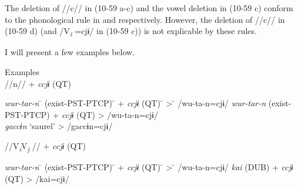 The deletion of //c// in (10-59 a-c) and the vowel deletion in (10-59 c) conform to the phonological rule in  and  respectively. However, the deletion of //c// in (10-59 d) (and /V\textit{\textsubscript{i} }=cjɨ/ in (10-59 c)) is not explicable by these rules.

I will present a few examples below.

\ea\label{ex:10.60}   Examples\\
  \ea //n// + \textit{ccjɨ} (QT)\\
  \begin{tabbing}
  \textit{wur-tar-n} \hspace{\tabcolsep}\=\hspace{\tabcolsep} (exist-PST-PTCP) \hspace{\tabcolsep}\=\hspace{\tabcolsep} +  \textit{ccjɨ}  (QT) \hspace{\tabcolsep}\=\hspace{\tabcolsep} > \hspace{\tabcolsep}\=\hspace{\tabcolsep} /wu-ta-n=cjɨ/\kill
  \textit{wur-tar-n} \> (exist-PST-PTCP) \> +  \textit{ccjɨ}  (QT) \> > \> /wu-ta-n=cjɨ/\\
  \textit{gaccɨn} \> ‘saurel’  \> \>      > \> /gaccɨn=cjɨ/
  \end{tabbing}

  \ex //V\textit{\textsubscript{i}}V\textit{\textsubscript{j} }// + \textit{ccjɨ} (QT)\\
  \begin{tabbing}
  \textit{wur-tar-n} \hspace{\tabcolsep}\=\hspace{\tabcolsep} (exist-PST-PTCP) \hspace{\tabcolsep}\=\hspace{\tabcolsep} +  \textit{ccjɨ}  (QT) \hspace{\tabcolsep}\=\hspace{\tabcolsep} > \hspace{\tabcolsep}\=\hspace{\tabcolsep} /wu-ta-n=cjɨ/\kill
  \textit{kai} \> (DUB) \> +  \textit{ccjɨ}  (QT) \> > \> /kai=cjɨ/
  \end{tabbing}

